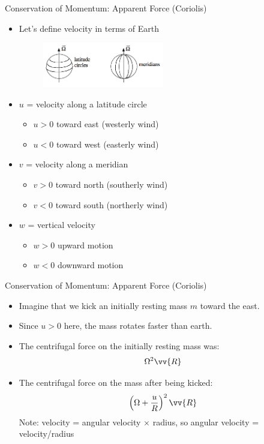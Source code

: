 \begin{frame}{Conservation of Momentum: Apparent Force (Coriolis)}

\begin{itemize}
	\item Let's define velocity in terms of Earth
	\begin{figure}
		\includegraphics[width=0.5\textwidth]{coriolis1}	
	\end{figure}
	\item $u$ = velocity along a latitude circle
	\begin{itemize}
		\item $u > 0$ toward east (westerly wind)
		\item $u < 0$ toward west (easterly wind)
	\end{itemize}
	\item $v$ = velocity along a meridian
	\begin{itemize}
		\item $v > 0$ toward north (southerly wind)
		\item $v < 0$ toward south (northerly wind)
	\end{itemize}
	\item $w$ = vertical velocity
	\begin{itemize}
		\item $w > 0$ upward motion
		\item $w < 0$ downward motion
	\end{itemize}
\end{itemize}
\end{frame}
\begin{frame}{Conservation of Momentum: Apparent Force (Coriolis)}

\begin{itemize}
	\item Imagine that we kick an initially resting mass $m$ toward the east.
	\item Since $u>0$ here, the mass rotates faster than earth.
	\item The centrifugal force on the initially resting mass was:
	$$\Omega^2 \vv{R}$$
	\item The centrifugal force on the mass after being kicked:
	$$\left(\Omega + \frac{u}{R}\right)^2 \vv{R}$$
	Note: velocity = angular velocity $\times$ radius, so angular velocity = velocity/radius
\end{itemize}
\end{frame}
